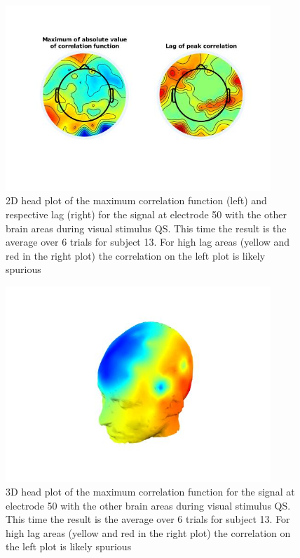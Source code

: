 \documentclass[a4paper]{article}
\begin{document}
\begin{figure}[H]
    \centering
    \includegraphics[width=10cm]{avgtopoplot.jpg}
    \caption{2D head plot of the maximum correlation function (left) and respective lag (right) for the signal at electrode 50 with the other brain areas during visual stimulus QS. This time the result is the average over 6 trials for subject 13. For high lag areas (yellow and red in the right plot) the correlation on the left plot is likely spurious}
    \label{fig:avgtopoplot}
\end{figure}

\begin{figure}[H]
    \centering
    \includegraphics[width=10cm]{avgheadplot.jpg}
    \caption{3D head plot of the maximum correlation function for the signal at electrode 50 with the other brain areas during visual stimulus QS. This time the result is the average over 6 trials for subject 13. For high lag areas (yellow and red in the right plot) the correlation on the left plot is likely spurious}
    \label{fig:avgheadplot}
\end{figure}
\end{document}
